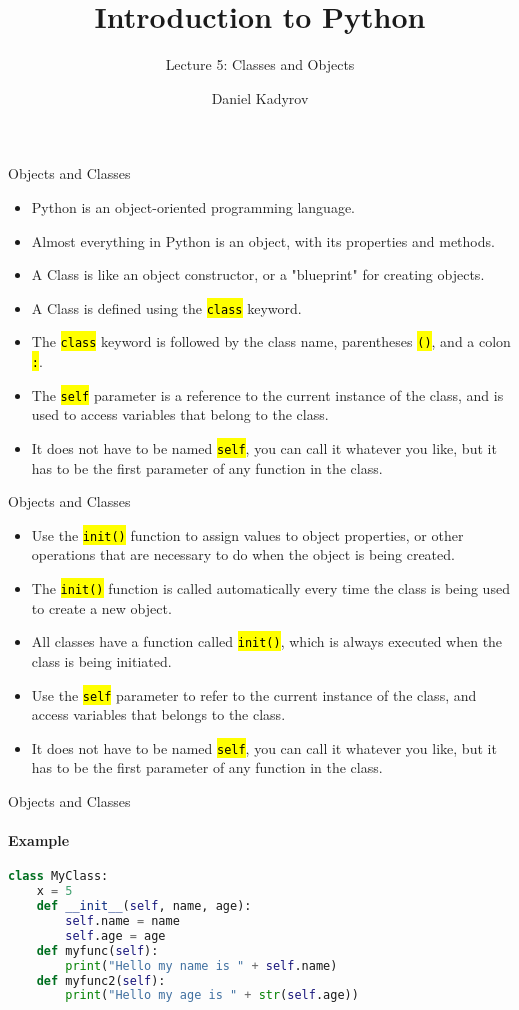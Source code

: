 \documentclass[
    aspectratio=169, 
    usepdftitle=false, 
    xcolor={dvipsnames},
    hyperref={
        colorlinks,
        linkcolor=black,
        urlcolor=blue}
    ]{beamer}
\title[Introduction to Python]{Introduction to Python}
\subtitle{Lecture 5: Classes and Objects}
\author{Daniel Kadyrov}
\date{}
\let\OldTexttt\texttt
\renewcommand{\texttt}[1]{\OldTexttt{\hl{#1}}}%
\begin{document}
\begin{frame}
    \titlepage
\end{frame}

\begin{frame}[fragile]{Objects and Classes}
    \begin{itemize}
        \item Python is an object-oriented programming language.
        \item Almost everything in Python is an object, with its properties and methods.
        \item A Class is like an object constructor, or a "blueprint" for creating objects.
        \item A Class is defined using the \texttt{class} keyword.
        \item The \texttt{class} keyword is followed by the class name, parentheses \texttt{()}, and a colon \texttt{:}.
        \item The \texttt{self} parameter is a reference to the current instance of the class, and is used to access variables that belong to the class.
        \item It does not have to be named \texttt{self}, you can call it whatever you like, but it has to be the first parameter of any function in the class.
    \end{itemize}
\end{frame}

\begin{frame}[fragile]{Objects and Classes}
    \begin{itemize}
        \item Use the \texttt{init()} function to assign values to object properties, or other operations that are necessary to do when the object is being created.
        \item The \texttt{init()} function is called automatically every time the class is being used to create a new object.
        \item All classes have a function called \texttt{init()}, which is always executed when the class is being initiated.
        \item Use the \texttt{self} parameter to refer to the current instance of the class, and access variables that belongs to the class.
        \item It does not have to be named \texttt{self}, you can call it whatever you like, but it has to be the first parameter of any function in the class.
    \end{itemize}
\end{frame}

\begin{frame}[fragile]{Objects and Classes}
    \framesubtitle{Example}
    \begin{lstlisting}[language=Python]
class MyClass:
    x = 5
    def __init__(self, name, age):
        self.name = name
        self.age = age
    def myfunc(self):
        print("Hello my name is " + self.name)
    def myfunc2(self):
        print("Hello my age is " + str(self.age))
    \end{lstlisting}
\end{frame}
\end{document}
